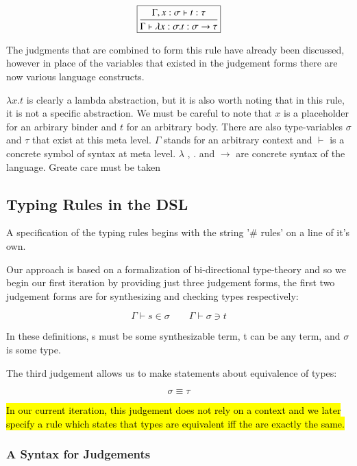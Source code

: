 $$\boxed{
\mbox{\begin {prooftree}
  \hypo{\Gamma , x : \sigma \vdash t : \tau}
  \infer1[]{\Gamma \vdash \lambda x : \sigma . t : \sigma \to \tau}
\end {prooftree}}
}$$


The judgments that are combined to form this rule have already been
discussed, however in place of the variables that existed in the
judgement forms there are now various language constructs.

$\lambda x . t$ is clearly a lambda abstraction, but it is also worth
noting that in this rule, it is not a specific abstraction. We must be
careful to note that $x$ is a placeholder for an arbirary binder and
$t$ for an arbitrary body. There are also type-variables $\sigma$ and
$\tau$ that exist at this meta level. $\Gamma$ stands for an arbitrary
context and $\vdash$ is a concrete symbol of syntax at meta
level. $\lambda$ , $.$ and $\to$ are concrete syntax of the
language. Greate care must be taken

\subsection{Typing Rules in the DSL}

A specification of the typing rules begins with the string '\# rules'
on a line of it's own.

Our approach is based on a formalization of bi-directional type-theory
\cite{TypesWhoSayNi} and so we begin our first iteration by providing
just three judgement forms, the first two judgement forms are for
synthesizing and checking types respectively:

$$\boxed{\Gamma \vdash s \in \sigma} \qquad \boxed{\Gamma \vdash \sigma
  \ni t}$$

In these definitions, s must be some synthesizable term, t can be any
term, and $\sigma$ is some type.

The third judgement allows us to make statements about equivalence of
types:

$$\boxed{\sigma \equiv \tau}$$

\hl{In our current iteration, this judgement does not rely on a
  context and we later specify a rule which states that types are
  equivalent iff the are exactly the same.}

\subsubsection{A Syntax for Judgements}

